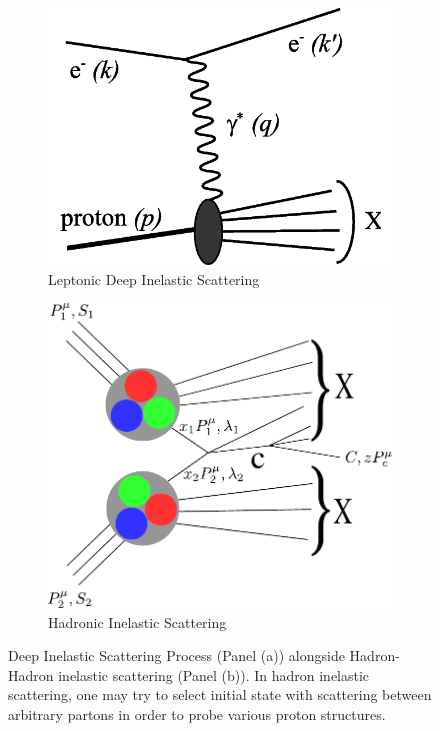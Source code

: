 \begin{figure}[ht]
  \centering
	\begin{subfigure}{0.5\textwidth}
		\centering
		\includegraphics[width=\textwidth]{./figures/deep_inelastic_basic.png}
    \caption{Leptonic Deep Inelastic Scattering}
		\label{fig:dis}
	\end{subfigure}%
	\begin{subfigure}{0.5\textwidth}
		\centering
		\includegraphics[width=\textwidth]{./figures/hadron_inlastic_scattering.pdf}
    \caption{Hadronic Inelastic Scattering}
    \label{fig:his}
	\end{subfigure}
  \caption{
    Deep Inelastic Scattering Process (Panel (a)) alongside Hadron-Hadron
    inelastic scattering (Panel (b)). In hadron inelastic scattering, one may
    try to select initial state with scattering between arbitrary partons in
    order to probe various proton structures.
  }
  \label{fig:hadron_inelastic_scattering}
\end{figure}

